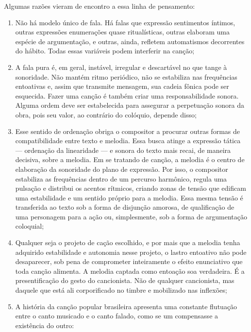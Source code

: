 Algumas razões vieram de encontro a essa linha de pensamento:

\begin{enumerate}[label=\scshape\alph*.]
\item Não há modelo único de fala. Há falas que expressão sentimentos
íntimos, outras expressões enumerações quase ritualísticas, outras
elaboram uma espécie de argumentação, e outras, ainda, refletem
automatismos decorrentes do hábito. Todas essas variáveis podem
interferir na canção;

\item A fala pura é, em geral, instável, irregular e descartável no que
tange à sonoridade. Não mantém ritmo periódico, não se estabiliza nas
frequências entoativas e, assim que transmite mensagem, sua cadeia
fônica pode ser esquecida. Fazer uma canção é também criar uma
responsabilidade sonora. Alguma ordem deve ser estabelecida para
assegurar a perpetuação sonora da obra, pois seu valor, ao contrário do
colóquio, depende disso;

\item Esse sentido de ordenação obriga o compositor a procurar outras
formas de compatibilidade entre texto e melodia. Essa busca atinge a
expressão tática --- ordenação da linearidade --- e sonora do texto mais
recai, de maneira decisiva, sobre a melodia. Em se tratando de canção, a
melodia é o centro de elaboração da sonoridade do plano de expressão.
Por isso, o compositor estabiliza as frequências dentro de um percurso
harmônico, regula uma pulsação e distribui os acentos rítmicos, criando
zonas de tensão que edificam uma estabilidade e um sentido próprio para
a melodia. Essa mesma tensão é transferida ao texto sob a forma de
disjunção amorosa, de qualificação de uma personagem para a ação ou,
simplesmente, sob a forma de argumentação coloquial;

\item Qualquer seja o projeto de cação escolhido, e por mais que a melodia
tenha adquirido estabilidade e autonomia nesse projeto, o lastro
entoativo não pode desaparecer, sob pena de comprometer inteiramente o
efeito enunciativo que toda canção alimenta. A melodia captada como
entoação soa verdadeira. É a presentificação do gesto do cancionista.
Não de qualquer cancionista, mas daquele que está ali corporificado no
timbre e mobilizado nas inflexões;

\item A história da canção popular brasileira apresenta uma constante
flutuação entre o canto musicado e o canto falado, como se um
compensasse a existência do outro:


\end{enumerate}
